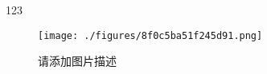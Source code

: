 
123

\begin{figure}[ht]
\centering
\texttt{[image: ./figures/8f0c5ba51f245d91.png]}
\caption{请添加图片描述} \label{fig_testcs_1}
\end{figure}